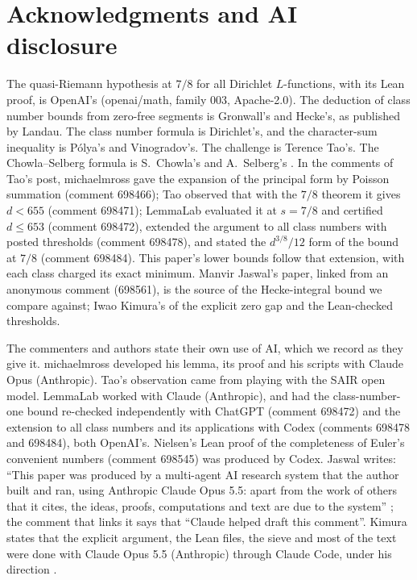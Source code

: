 \documentclass[11pt]{article}
\theoremstyle{definition}
\begin{document}
\section*{Acknowledgments and AI disclosure}

The quasi-Riemann hypothesis at $7/8$ for all Dirichlet $L$-functions, with its Lean proof, is OpenAI's (openai/math, family 003, Apache-2.0). The deduction of class number bounds from zero-free segments is Gronwall's and Hecke's, as published by Landau. The class number formula is Dirichlet's, and the character-sum inequality is Pólya's and Vinogradov's. The challenge is Terence Tao's. The Chowla--Selberg formula is S.~Chowla's and A.~Selberg's \cite{ChowlaSelberg1967}. In the comments of Tao's post, michaelmross gave the expansion of the principal form by Poisson summation (comment 698466); Tao observed that with the $7/8$ theorem it gives $d < 655$ (comment 698471); LemmaLab evaluated it at $s = 7/8$ and certified $d \le 653$ (comment 698472), extended the argument to all class numbers with posted thresholds (comment 698478), and stated the $d^{3/8}/12$ form of the bound at $7/8$ (comment 698484). This paper's lower bounds follow that extension, with each class charged its exact minimum. Manvir Jaswal's paper, linked from an anonymous comment (698561), is the source of the Hecke-integral bound we compare against; Iwao Kimura's of the explicit zero gap and the Lean-checked thresholds.

The commenters and authors state their own use of AI, which we record as they give it. michaelmross developed his lemma, its proof and his scripts with Claude Opus (Anthropic). Tao's observation came from playing with the SAIR open model. LemmaLab worked with Claude (Anthropic), and had the class-number-one bound re-checked independently with ChatGPT (comment 698472) and the extension to all class numbers and its applications with Codex (comments 698478 and 698484), both OpenAI's. Nielsen's Lean proof of the completeness of Euler's convenient numbers (comment 698545) was produced by Codex. Jaswal writes: ``This paper was produced by a multi-agent AI research system that the author built and ran, using Anthropic Claude Opus 5.5: apart from the work of others that it cites, the ideas, proofs, computations and text are due to the system'' \cite{Jaswal2026}; the comment that links it says that ``Claude helped draft this comment''. Kimura states that the explicit argument, the Lean files, the sieve and most of the text were done with Claude Opus 5.5 (Anthropic) through Claude Code, under his direction \cite[\S8]{Kimura2026}.
\end{document}
